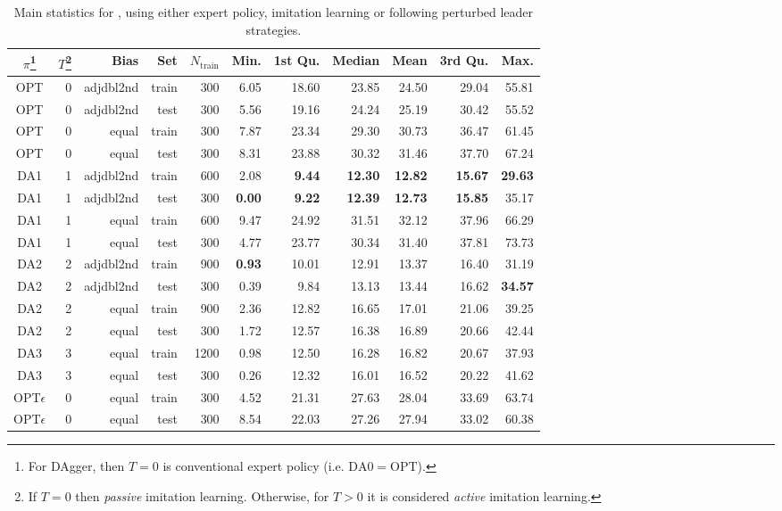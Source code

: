 \begin{table}[t]
\caption{Main statistics for  \namerho, using either expert
   policy, imitation learning or following perturbed leader 
   strategies.}\label{tbl:IL:stats} 
\centering
\noindent
\begin{minipage}{\textwidth}
\begin{tabular}{c@{}rrrrrrrrrr}
  \toprule
  $\pi$\footnote{For DAgger, then $T=0$ is conventional expert policy (i.e. 
  $\text{DA}0=\text{OPT}$).}
  & $T$\footnote{If $T=0$ then \emph{passive} imitation learning. 
  Otherwise, for $T>0$ it is considered \emph{active} imitation learning.}
  & Bias & Set & $N_{\text{train}}$ & Min. & 1st Qu. & Median & 
  Mean & 3rd Qu. & Max. \\ 
  \midrule  
  OPT & 0 & adjdbl2nd & train & 300 & 6.05 & 18.60 & 23.85 & 24.50 & 
  29.04 & 55.81 \\ 
  OPT & 0 & adjdbl2nd & test & 300 & 5.56 & 19.16 & 24.24 & 25.19 & 
  30.42 & 55.52 \\ 
  OPT & 0 & equal & train & 300 & 7.87 & 23.34 & 29.30 & 30.73 & 36.47 & 
  61.45 \\ 
  OPT & 0 & equal & test & 300 & 8.31 & 23.88 & 30.32 & 31.46 & 37.70 & 
  67.24 \\ 
  DA1 & 1 & adjdbl2nd & train & 600 & 2.08 & \textbf{9.44} & \textbf{12.30} & 
  \textbf{12.82} & \textbf{15.67} & \textbf{29.63} \\ 
  DA1 & 1 & adjdbl2nd & test & 300 & \textbf{0.00} & \textbf{9.22} & 
  \textbf{12.39} & \textbf{12.73} & \textbf{15.85} & 35.17 \\ 
  DA1 & 1 & equal & train & 600 & 9.47 & 24.92 & 31.51 & 32.12 & 37.96 & 
  66.29 \\ 
  DA1 & 1 & equal & test & 300 & 4.77 & 23.77 & 30.34 & 31.40 & 37.81 & 
  73.73 \\ 
  DA2 & 2 & adjdbl2nd & train & 900 & \textbf{0.93} & 10.01 & 12.91 & 13.37 & 
  16.40 & 31.19 \\ 
  DA2 & 2 & adjdbl2nd & test & 300 & 0.39 & 9.84 & 13.13 & 13.44 & 16.62 
  & \textbf{34.57} \\ 
  DA2 & 2 & equal & train & 900 & 2.36 & 12.82 & 16.65 & 17.01 & 21.06 & 
  39.25 \\ 
  DA2 & 2 & equal & test & 300 & 1.72 & 12.57 & 16.38 & 16.89 & 20.66 & 
  42.44 \\ 
  DA3 & 3 & equal & train & 1200 & 0.98 & 12.50 & 16.28 & 16.82 & 20.67 & 
  37.93 \\ 
  DA3 & 3 & equal & test & 300 & 0.26 & 12.32 & 16.01 & 16.52 & 20.22 & 
  41.62 \\ 
  \midrule
  OPT$\epsilon$ & 0 & equal & train & 300 & 4.52 & 21.31 & 27.63 & 28.04 & 
  33.69 & 63.74 \\ 
  OPT$\epsilon$ & 0 & equal & test & 300 & 8.54 & 22.03 & 27.26 & 27.94 & 33.02 
  & 60.38 \\ 
  \bottomrule
\end{tabular}
\end{minipage}
\end{table}